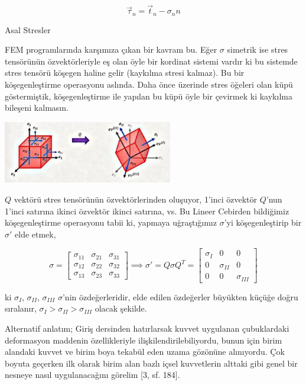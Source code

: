 \documentclass[12pt,fleqn]{article}\usepackage{../../common}
\begin{document}
$$
\vec{\tau}_n  = \vec{t}_n - \sigma_n n
$$

Asal Stresler

FEM programlarında karşımıza çıkan bir kavram bu. Eğer $\sigma$ simetrik ise
stres tensörünün özvektörleriyle eş olan öyle bir kordinat sistemi vardır ki bu
sistemde stres tensörü köşegen haline gelir (kaykılma stresi kalmaz). Bu bir
köşegenleştirme operasyonu aslında.  Daha önce üzerinde stres öğeleri olan küpü
göstermiştik, köşegenleştirme ile yapılan bu küpü öyle bir çevirmek ki kaykılma
bileşeni kalmasın.

\includegraphics[width=20em]{phy_020_strs_02_08.jpg}

$Q$ vektörü stres tensörünün özvektörlerinden oluşuyor, 1'inci özvektör $Q$'nun
1'inci satırına ikinci özvektör ikinci satırına, vs. Bu Lineer Cebirden
bildiğimiz köşegenleştirme operasyonu tabii ki, yapmaya uğraştığımız $\sigma$'yi
köşegenleştirip bir $\sigma'$ elde etmek,

$$
\sigma = 
\left[\begin{array}{ccc}
\sigma_{11} & \sigma_{21} & \sigma_{31} \\
\sigma_{12} & \sigma_{22} & \sigma_{32} \\
\sigma_{13} & \sigma_{23} & \sigma_{33} 
\end{array}\right] \implies
\sigma' = Q \sigma Q^T =
\left[\begin{array}{ccc}
\sigma_I & 0           & 0 \\
0        & \sigma_{II} & 0 \\
0        & 0           & \sigma_{III}
\end{array}\right]
$$

ki $\sigma_I$, $\sigma_{II}$, $\sigma_{III}$ $\sigma$'nin özdeğerleridir, elde
edilen özdeğerler büyükten küçüğe doğru sıralanır, $\sigma_I > \sigma_{II} > \sigma_{III}$
olacak şekilde.

Alternatif anlatım; Giriş dersinden hatırlarsak kuvvet uygulanan çubuklardaki
deformasyon maddenin özellikleriyle ilişkilendirilebiliyordu, bunun için birim
alandaki kuvvet ve birim boya tekabül eden uzama gözönüne alınıyordu. Çok boyuta
geçerken ilk olarak birim alan bazlı içsel kuvvetlerin alttaki gibi genel bir
nesneye nasıl uygulanacağını görelim [3, sf. 184].
\end{document}
